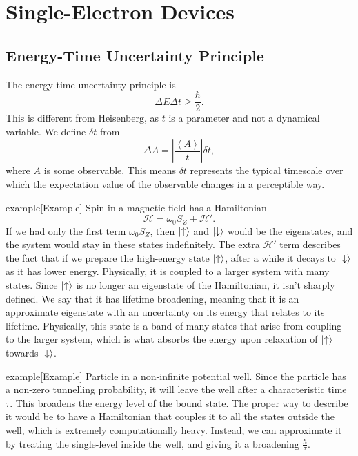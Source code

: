 \documentclass{article}
\begin{document}
\section{Single-Electron Devices}
\subsection{Energy-Time Uncertainty Principle}
The energy-time uncertainty principle is 
\[
    \Delta E\Delta t\geq \frac{\hbar }{2}.
\]
This is different from Heisenberg, as $t$ is a parameter and not a dynamical variable. We define $\delta t$ from 
\[
    \Delta A=\left| \frac{\left\langle A \right\rangle }{t} \right|\delta t,
\]
where $A$ is some observable. This means $\delta t$ represents the typical timescale over which the expectation value of the observable changes in a perceptible way.

\begin{callout}{example}[Example]
\label{example:s11-e1}
Spin in a magnetic field has a Hamiltonian 
\[
    \mathcal{H}=\omega _0S_Z+\mathcal{H}'.
\]
If we had only the first term $\omega _0S_Z$, then $\ket{\uparrow}$ and $\ket{\downarrow}$ would be the eigenstates, and the system would stay in these states indefinitely. The extra $\mathcal{H}'$ term describes the fact that if we prepare the high-energy state $\ket{\uparrow}$, after a while it decays to $\ket{\downarrow}$ as it has lower energy. Physically, it is coupled to a larger system with many states. Since $\ket{\uparrow}$ is no longer an eigenstate of the Hamiltonian, it isn't sharply defined. We say that it has lifetime broadening, meaning that it is an approximate eigenstate with an uncertainty on its energy that relates to its lifetime. Physically, this state is a band of many states that arise from coupling to the larger system, which is what absorbs the energy upon relaxation of $\ket{\uparrow}$ towards $\ket{\downarrow}$.
\end{callout}

\begin{callout}{example}[Example]
\label{example:s11-e2}
Particle in a non-infinite potential well. Since the particle has a non-zero tunnelling probability, it will leave the well after a characteristic time $\tau $. This broadens the energy level of the bound state. The proper way to describe it would be to have a Hamiltonian that couples it to all the states outside the well, which is extremely computationally heavy. Instead, we can approximate it by treating the single-level inside the well, and giving it a broadening $\frac{\hbar }{\tau }$.
\end{callout}
\end{document}
